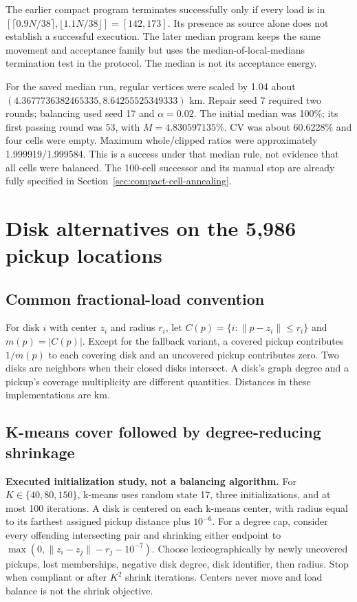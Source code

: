 \documentclass[11pt]{article}
\begin{document}
The earlier compact program terminates successfully only if every load is in
$[\lceil0.9N/38\rceil,\lfloor1.1N/38\rfloor]=[142,173]$.
Its presence as source alone does not establish a successful execution.
The later median program keeps the same movement and acceptance family but
uses the median-of-local-medians termination test in the protocol. The median
is not its acceptance energy.

For the saved median run, regular vertices were scaled by 1.04 about
$(4.3677736382465335,8.64255525349333)$ km. Repair seed 7 required two rounds;
balancing used seed 17 and $\alpha=0.02$. The initial median was 100\%; its first
passing round was 53, with $M=4.830597135\%$. CV was about 60.6228\% and four
cells were empty. Maximum whole/clipped ratios were approximately
1.999919/1.999584. This is a success under that median rule, not evidence that
all cells were balanced. The 100-cell successor and its manual stop are already
fully specified in Section~\ref{sec:compact-cell-annealing}.

\section{Disk alternatives on the 5,986 pickup locations}
\subsection{Common fractional-load convention}
For disk $i$ with center $z_i$ and radius $r_i$, let
$C(p)=\{i:\|p-z_i\|\leq r_i\}$ and $m(p)=|C(p)|$.
Except for the fallback variant, a covered pickup contributes $1/m(p)$ to each
covering disk and an uncovered pickup contributes zero. Two disks are neighbors
when their closed disks intersect. A disk's graph degree and a pickup's coverage
multiplicity are different quantities. Distances in these implementations are km.

\subsection{K-means cover followed by degree-reducing shrinkage}
\textbf{Executed initialization study, not a balancing algorithm.}
For $K\in\{40,80,150\}$, k-means uses random state 17, three initializations,
and at most 100 iterations. A disk is centered on each k-means center, with
radius equal to its farthest assigned pickup distance plus $10^{-6}$.
For a degree cap, consider every offending intersecting pair and shrinking
either endpoint to $\max(0,\|z_i-z_j\|-r_j-10^{-7})$.
Choose lexicographically by newly uncovered pickups, lost memberships,
negative disk degree, disk identifier, then radius. Stop when compliant or
after $K^2$ shrink iterations. Centers never move and load balance is not the
shrink objective.
\end{document}
